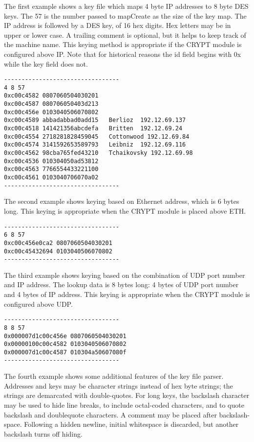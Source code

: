 The first example shows a key file which maps 4 byte IP 
addresses to 8 byte DES keys. The 57 is the number passed to 
mapCreate as the size of the key map. The IP address is 
followed by a DES key, of 16 hex digits. Hex letters may be
in upper or lower case. A trailing comment is optional, but it
helps to keep track of the machine name. This keying method is 
appropriate if the CRYPT module is configured above IP.
Note that for historical reasons the id field begins with 
0x while the key field does not.

\begin{verbatim}
---------------------------------
4 8 57
0xc00c4582 0807060504030201  
0xc00c4587 080706050403d213
0xc00c456e 0103040506070802
0xc00c4589 abbadabbad0add15   Berlioz  192.12.69.137
0xc00c4518 141421356abcdefa   Britten  192.12.69.24
0xc00c4554 2718281828459045   Cottonwood 192.12.69.84
0xc00c4574 3141592653589793   Leibniz  192.12.69.116
0xc00c4562 98cba765fed43210   Tchaikovsky 192.12.69.98
0xc00c4536 010304050ad53812
0xc00c4563 7766554433221100
0xc00c4561 0103040706070a02
---------------------------------
\end{verbatim}

The second example shows keying based on Ethernet address, 
which is 6 bytes long. This keying is appropriate when the 
CRYPT module is placed above ETH.
\begin{verbatim}
---------------------------------
6 8 57
0xc00c456e0ca2 0807060504030201  
0xc00c45432694 0103040506070802
---------------------------------
\end{verbatim}

The third example shows keying based on the combination of 
UDP port number and IP address.  The lookup data is 8 bytes 
long: 4 bytes of UDP port number and 4 bytes of IP address.  
This keying is appropriate when the CRYPT module is 
configured above UDP.
\begin{verbatim}
---------------------------------
8 8 57
0x000007d1c00c456e 0807060504030201  
0x00000100c00c4582 0103040506070802
0x000007d1c00c4587 010304a50607080f
---------------------------------
\end{verbatim}

The fourth example shows some additional features of the key
file parser.  Addresses and keys may be character strings instead
of hex byte strings; the strings are demarcated with double-quotes.
For long keys, the backslash character may be used to hide line
breaks, to include octal-coded characters, and to quote backslash
and doublequote characters.  A comment may be placed after backslash-space.
Following a hidden newline, initial whitespace is discarded,
but another backslash turns off hiding.

